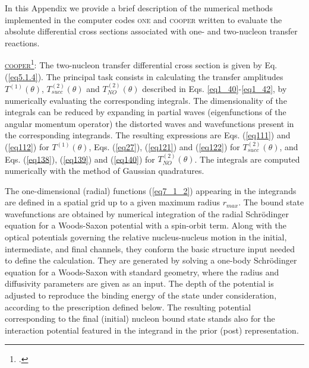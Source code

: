 \begin{subappendices}



In this Appendix we provide a brief description of the numerical methods implemented in the computer codes \textsc{one} and \textsc{cooper} written to evaluate the absolute differential cross sections associated with one- and two-nucleon transfer reactions.


 
 
 
 \underline{\textsc{cooper}}\footnote{\cite{Potel:12c}.}: The two-nucleon transfer differential cross section is given by Eq. (\ref{eq5.1.4}).  The principal task consists in calculating the transfer amplitudes $T^{(1)}(\theta)$, $T^{(2)}_{succ}(\theta)$ and $T^{(2)}_{NO}(\theta)$ described in Eqs. \ref{eq1_40}-\ref{eq1_42}, by numerically evaluating the corresponding integrals.  The dimensionality of the integrals  can be reduced by expanding in partial waves (eigenfunctions of the angular momentum operator) the distorted waves and wavefunctions present in the corresponding integrands. The resulting expressions are Eqs. (\ref{eq111}) and (\ref{eq112}) for $T^{(1)}(\theta)$, Eqs. (\ref{eq27}), (\ref{eq121}) and (\ref{eq122}) for $T^{(2)}_{succ}(\theta)$, and Eqs. (\ref{eq138}), (\ref{eq139}) and (\ref{eq140}) for $T^{(2)}_{NO}(\theta)$. The integrals are computed numerically with the method of Gaussian quadratures. 


The one-dimensional (radial) functions (\ref{eq7_1_2}) appearing in the integrands are defined in a spatial grid up to a given maximum radius $r_{max}$. The bound state  wavefunctions are obtained by numerical integration of the radial Schr\"odinger equation for a Woods-Saxon potential with a spin-orbit term. Along with the optical potentials governing the relative nucleus-nucleus motion in the initial, intermediate, and final channels, they conform the basic structure input needed to define the calculation. They are generated by solving a one-body Schr\"odinger equation for a Woods-Saxon with standard geometry, where the radius and diffusivity parameters are given as an input. The depth of the potential is adjusted to reproduce the binding energy of the state under consideration, according to the prescription defined below. The resulting potential corresponding to the final (initial) nucleon bound state stands also for the interaction potential featured in the integrand in the prior (post) representation. 


\end{subappendices}
